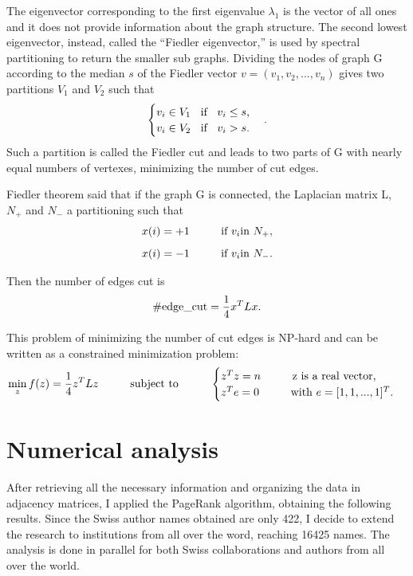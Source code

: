 \documentclass[]{usiinfbachelorproject}
\newcommand\tab[1][1cm]{\hspace*{#1}}
\begin{document}
The eigenvector corresponding to the first eigenvalue $\lambda_1$ is the vector of all ones and it does not provide information about the graph structure. The second lowest eigenvector, instead, called the ``Fiedler eigenvector,'' is used by spectral partitioning to return the smaller sub graphs. Dividing the nodes of graph G according to the median $s$ of the Fiedler vector $v = (v_1,v_2,...,v_n)$ gives two partitions $V_1$ and $V_2$ such that
\begin{equation}\notag
\begin{cases}
v_i \in V_1 \text{\;\; if \;\;} v_i \leq s \text{,}\\
v_i \in V_2 \text{\;\; if \;\;} v_i > s \text{.}
\end{cases} .
\end{equation}
Such a partition is called the Fiedler cut and leads to two parts of G with nearly equal numbers of vertexes, minimizing the number of cut edges. 

Fiedler theorem said that if the graph G is connected, the Laplacian matrix L, $N_+$ and $N_-$ a partitioning such that
\begin{equation}\notag
x(i) = +1 \tab \text{if } v_i \text{in } N_+  \text{,}
\end{equation}
\begin{equation}\notag
x(i) = -1 \tab \text{if } v_i \text{in } N_- \text{.}
\end{equation}

Then the number of edges cut is
\begin{equation}\notag
\#\text{edge\_cut} = \frac{1}{4}x^T L x \text{.}
\end{equation}

This problem of minimizing the number of cut edges is NP-hard and can be written as a constrained minimization problem:
\begin{equation}\notag
\min\limits_z f(z)=\frac{1}{4} z^T L z \tab \text{subject to} \tab 
\begin{cases}
z^T z = n \tab \text{z is a real vector} \text{,}\\
z^T e = 0 \tab \text{with } e=[1,1,...,1]^T \text{.}
\end{cases}
\end{equation}








\section{Numerical analysis}
After retrieving all the necessary information and organizing the data in adjacency matrices, I applied the PageRank algorithm, obtaining the following results.
Since the Swiss author names obtained are only 422, I decide to extend the research to institutions from all over the word, reaching 16425 names. The analysis is done in parallel for both Swiss collaborations and authors from all over the world.
\end{document}
